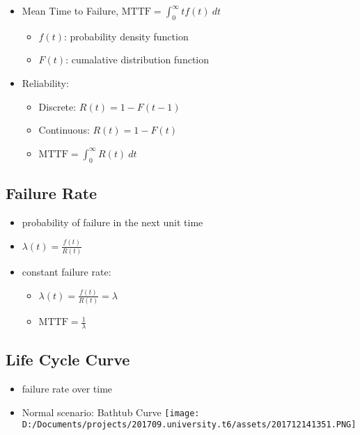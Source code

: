 \documentclass[11pt]{article}
\makeatletter
\def\maxwidth{\ifdim\Gin@nat@width>\linewidth\linewidth
    \else\Gin@nat@width\fi}
\let\Oldincludegraphics\includegraphics
\renewcommand{\includegraphics}[1]{\Oldincludegraphics[width=.8\maxwidth]{#1}}
\providecommand{\tightlist}{%
      \setlength{\itemsep}{0pt}\setlength{\parskip}{0pt}}
\makeatother
\begin{document}
\begin{itemize}
\tightlist
\item
  Mean Time to Failure, \(\text{MTTF} = \int_0^\infty tf(t)\ dt\)

  \begin{itemize}
  \tightlist
  \item
    \(f(t)\): probability density function
  \item
    \(F(t)\): cumalative distribution function
  \end{itemize}
\item
  Reliability:

  \begin{itemize}
  \tightlist
  \item
    Discrete: \(R(t)=1-F(t-1)\)
  \item
    Continuous: \(R(t)=1-F(t)\)
  \item
    \(\text{MTTF}=\int_0^\infty R(t)\ dt\)
  \end{itemize}
\end{itemize}

\hypertarget{failure-rate}{%
\subsection{Failure Rate}\label{failure-rate}}

\begin{itemize}
\item
  probability of failure in the next unit time
\item
  \(\lambda(t)=\frac{f(t)}{R(t)}\)
\item
  constant failure rate:

  \begin{itemize}
  \tightlist
  \item
    \(\lambda(t)=\frac{f(t)}{R(t)}=\lambda\)
  \item
    \(\text{MTTF}=\frac{1}{\lambda}\)
  \end{itemize}
\end{itemize}

\hypertarget{life-cycle-curve}{%
\subsection{Life Cycle Curve}\label{life-cycle-curve}}

\begin{itemize}
\tightlist
\item
  failure rate over time
\item
  Normal scenario: Bathtub Curve
  \texttt{[image: D:/Documents/projects/201709.university.t6/assets/201712141351.PNG]}
\end{itemize}
\end{document}
